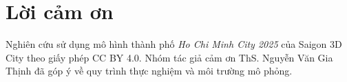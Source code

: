 
\section{Lời cảm ơn}

Nghiên cứu sử dụng mô hình thành phố \textit{Ho Chi Minh City 2025} của Saigon 3D
City theo giấy phép CC BY 4.0. Nhóm tác giả cảm ơn ThS. Nguyễn Văn Gia Thịnh đã góp
ý về quy trình thực nghiệm và môi trường mô phỏng.
